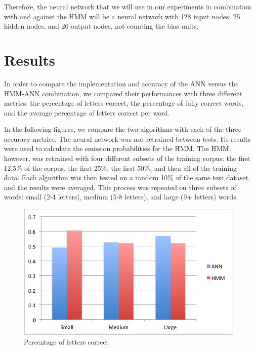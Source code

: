 \documentclass[11pt,a4paper,twocolumn]{article}
\begin{document}
Therefore, the neural network that we will use in our experiments in combination with and against the HMM will be a neural network with 128 input nodes, 25 hidden nodes, and 26 output nodes, not counting the bias units.


\section{Results}

In order to compare the implementation and accuracy of the ANN versus the HMM-ANN combination, we compared their performances with three different metrics: the percentage of letters correct, the percentage of fully correct words, and the average percentage of letters correct per word. 

In the following figures, we compare the two algorithms with each of the three accuracy metrics. The neural network was not retrained between tests. Its results were used to calculate the emission probabilities for the HMM. The HMM, however, was retrained with four different subsets of the training corpus: the first 12.5\% of the corpus, the first 25\%, the first 50\%, and then all of the training data. Each algorithm was then tested on a random 10\% of the same test dataset, and the results were averaged. This process was repeated on three subsets of words: small (2-4 letters), medium (5-8 letters), and large (9+ letters) words.

\begin{figure}[h]
\centering
\caption{Percentage of letters correct}
\includegraphics[scale=0.55]{img/lettersCorrect.png}
\end{figure}
\end{document}

